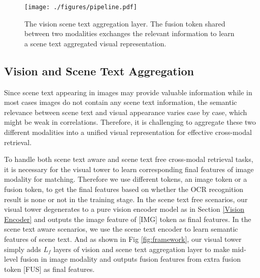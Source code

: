 \documentclass[10pt,twocolumn,letterpaper]{article}
\begin{document}
\begin{figure}[ht]
    \centering
    \texttt{[image: ./figures/pipeline.pdf]}\vspace{-0.5em}
    \caption{The vision scene text aggregation layer. The fusion token shared between two modalities exchanges the relevant information to learn a scene text aggregated visual representation.}\vspace{-1em}
    \label{fig:pipeline}
\end{figure}


\subsection{Vision and Scene Text Aggregation} 
\label{Vision and Scene Text Aggregation}
Since scene text appearing in images may provide valuable information while in most cases images do not contain any scene text information, the semantic relevance between scene text and visual appearance varies case by case, which might be weak in correlations. Therefore, it is challenging to aggregate these two different modalities into a unified visual representation for effective cross-modal retrieval.

To handle both scene text aware and scene text free cross-modal retrieval tasks, it is necessary for the visual tower to learn corresponding final features of image modality for matching. Therefore we use different tokens, an image token or a fusion token, to get the final features based on whether the OCR recognition result is none or not in the training stage.
In the scene text free scenarios, our visual tower degenerates to a pure vision encoder model as in Section \ref{Vision Encoder} and outputs the image feature of [IMG] token as final features.
In the scene text aware scenarios, we use the scene text encoder to learn semantic features of scene text.
And as shown in Fig \ref{fig:framework}, our visual tower simply adds $L_f$ layers of vision and scene text aggregation layer to make mid-level fusion in image modality and outputs fusion features from extra fusion token [FUS] as final features. 
\end{document}
